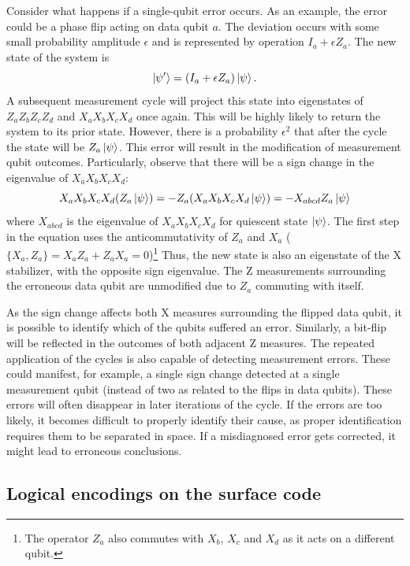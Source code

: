 Consider what happens if a single-qubit error occurs. As an example, the error could be a phase flip acting on data qubit $a$. The deviation occurs with some small probability amplitude $\epsilon$ and is represented by operation $I_a+\epsilon Z_a$. The new state of the system is
\begin{equation}
    \ket{\psi'}=(I_a+\epsilon Z_a)\ket{\psi}.
\end{equation}
A subsequent measurement cycle will project this state into eigenstates of $Z_aZ_bZ_cZ_d$ and $X_aX_bX_cX_d$ once again. This will be highly likely to return the system to its prior state. However, there is a probability $\epsilon^2$ that after the cycle the state will be $Z_a\ket{\psi}$. This error will result in the modification of measurement qubit outcomes. Particularly, observe that there will be a sign change in the eigenvalue of $X_aX_bX_cX_d$:
\begin{equation}
    X_aX_bX_cX_d(Z_a\ket{\psi})=-Z_a(X_aX_bX_cX_d\ket{\psi})=-X_{abcd} Z_a\ket{\psi}
\end{equation}
where $X_{abcd}$ is the eigenvalue of $X_aX_bX_cX_d$ for quiescent state $\ket{\psi}$. The first step in the equation uses the anticommutativity of $Z_a$ and $X_a$ ($\{X_a,Z_a\}=X_aZ_a+Z_aX_a=0$)\footnote{The operator $Z_a$ also commutes with $X_b$, $X_c$ and $X_d$ as it acts on a different qubit.} Thus, the new state is also an eigenstate of the X stabilizer, with the opposite sign eigenvalue. The Z measurements surrounding the erroneous data qubit are unmodified due to $Z_a$ commuting with itself.

As the sign change affects both X measures surrounding the flipped data qubit, it is possible to identify which of the qubits suffered an error. Similarly, a bit-flip will be reflected in the outcomes of both adjacent Z measures. The repeated application of the cycles is also capable of detecting measurement errors. These could manifest, for example, a single sign change detected at a single measurement qubit (instead of two as related to the flips in data qubits). These errors will often disappear in later iterations of the cycle. If the errors are too likely, it becomes difficult to properly identify their cause, as proper identification requires them to be separated in space. If a misdiagnosed error gets corrected, it might lead to erroneous conclusions.

\subsection{Logical encodings on the surface code}

